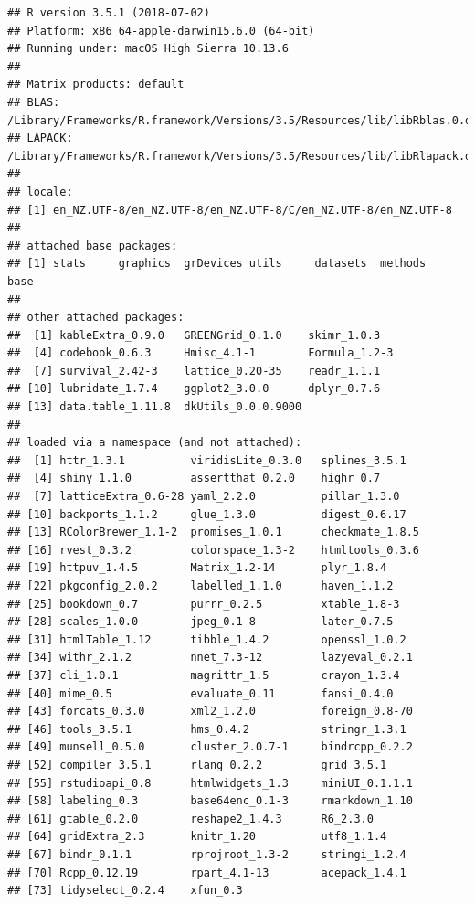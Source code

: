 \documentclass[]{article}
\begin{document}
\begin{verbatim}
## R version 3.5.1 (2018-07-02)
## Platform: x86_64-apple-darwin15.6.0 (64-bit)
## Running under: macOS High Sierra 10.13.6
## 
## Matrix products: default
## BLAS: /Library/Frameworks/R.framework/Versions/3.5/Resources/lib/libRblas.0.dylib
## LAPACK: /Library/Frameworks/R.framework/Versions/3.5/Resources/lib/libRlapack.dylib
## 
## locale:
## [1] en_NZ.UTF-8/en_NZ.UTF-8/en_NZ.UTF-8/C/en_NZ.UTF-8/en_NZ.UTF-8
## 
## attached base packages:
## [1] stats     graphics  grDevices utils     datasets  methods   base     
## 
## other attached packages:
##  [1] kableExtra_0.9.0   GREENGrid_0.1.0    skimr_1.0.3       
##  [4] codebook_0.6.3     Hmisc_4.1-1        Formula_1.2-3     
##  [7] survival_2.42-3    lattice_0.20-35    readr_1.1.1       
## [10] lubridate_1.7.4    ggplot2_3.0.0      dplyr_0.7.6       
## [13] data.table_1.11.8  dkUtils_0.0.0.9000
## 
## loaded via a namespace (and not attached):
##  [1] httr_1.3.1          viridisLite_0.3.0   splines_3.5.1      
##  [4] shiny_1.1.0         assertthat_0.2.0    highr_0.7          
##  [7] latticeExtra_0.6-28 yaml_2.2.0          pillar_1.3.0       
## [10] backports_1.1.2     glue_1.3.0          digest_0.6.17      
## [13] RColorBrewer_1.1-2  promises_1.0.1      checkmate_1.8.5    
## [16] rvest_0.3.2         colorspace_1.3-2    htmltools_0.3.6    
## [19] httpuv_1.4.5        Matrix_1.2-14       plyr_1.8.4         
## [22] pkgconfig_2.0.2     labelled_1.1.0      haven_1.1.2        
## [25] bookdown_0.7        purrr_0.2.5         xtable_1.8-3       
## [28] scales_1.0.0        jpeg_0.1-8          later_0.7.5        
## [31] htmlTable_1.12      tibble_1.4.2        openssl_1.0.2      
## [34] withr_2.1.2         nnet_7.3-12         lazyeval_0.2.1     
## [37] cli_1.0.1           magrittr_1.5        crayon_1.3.4       
## [40] mime_0.5            evaluate_0.11       fansi_0.4.0        
## [43] forcats_0.3.0       xml2_1.2.0          foreign_0.8-70     
## [46] tools_3.5.1         hms_0.4.2           stringr_1.3.1      
## [49] munsell_0.5.0       cluster_2.0.7-1     bindrcpp_0.2.2     
## [52] compiler_3.5.1      rlang_0.2.2         grid_3.5.1         
## [55] rstudioapi_0.8      htmlwidgets_1.3     miniUI_0.1.1.1     
## [58] labeling_0.3        base64enc_0.1-3     rmarkdown_1.10     
## [61] gtable_0.2.0        reshape2_1.4.3      R6_2.3.0           
## [64] gridExtra_2.3       knitr_1.20          utf8_1.1.4         
## [67] bindr_0.1.1         rprojroot_1.3-2     stringi_1.2.4      
## [70] Rcpp_0.12.19        rpart_4.1-13        acepack_1.4.1      
## [73] tidyselect_0.2.4    xfun_0.3
\end{verbatim}
\end{document}
